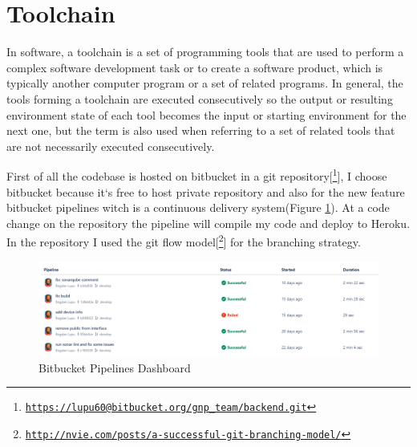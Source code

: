 \section{Toolchain}
In software, a toolchain is a set of programming tools that are used to perform a complex software development task or to create a software product, which is typically another computer program or a set of related programs. In general, the tools forming a toolchain are executed consecutively so the output or resulting environment state of each tool becomes the input or starting environment for the next one, but the term is also used when referring to a set of related tools that are not necessarily executed consecutively.
\newline

First of all the codebase is hosted on bitbucket in a git repository[\footnote{\href{https://lupu60@bitbucket.org/gnp\_team/backend.git}{\texttt{https://lupu60@bitbucket.org/gnp\_team/backend.git}}}], I choose bitbucket because it`s free to host private repository and also for the new feature bitbucket pipelines witch is a continuous delivery system(Figure \ref{fig:piplines}). At a code change on the repository the pipeline will compile my code and deploy to Heroku. In the repository I used the git flow model[\footnote{\href{http://nvie.com/posts/a-successful-git-branching-model/}{\texttt{http://nvie.com/posts/a-successful-git-branching-model/}}}] for the branching strategy.
\begin{figure}[h]
	\centering
	\includegraphics[width=\linewidth]{images/pipelines}
	\caption{Bitbucket Pipelines Dashboard}
	\label{fig:piplines}
\end{figure}

